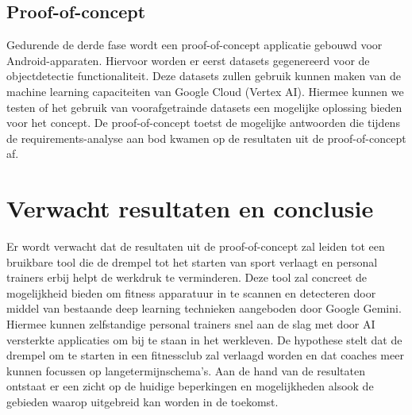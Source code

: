 \subsection{Proof-of-concept}
\label{subsec:poc}
Gedurende de derde fase wordt een proof-of-concept applicatie gebouwd voor Android-apparaten. %
Hiervoor worden er eerst datasets gegenereerd voor de objectdetectie functionaliteit.
Deze datasets zullen gebruik kunnen maken van de machine learning capaciteiten van Google Cloud (Vertex AI).
Hiermee kunnen we testen of het gebruik van voorafgetrainde datasets een mogelijke oplossing bieden voor het concept.
De proof-of-concept toetst de mogelijke antwoorden die tijdens de requirements-analyse aan bod kwamen op de resultaten uit de proof-of-concept af.

\section{Verwacht resultaten en conclusie}
\label{sec:verwacht-resultaten-en-conclusie}
Er wordt verwacht dat de resultaten uit de proof-of-concept zal leiden tot een bruikbare tool die de drempel tot het starten van sport verlaagt en personal trainers erbij helpt de werkdruk te verminderen.
Deze tool zal concreet de mogelijkheid bieden om fitness apparatuur in te scannen en detecteren door middel van bestaande deep learning technieken aangeboden door Google Gemini.
Hiermee kunnen zelfstandige personal trainers snel aan de slag met door AI versterkte applicaties om bij te staan in het werkleven.
De hypothese stelt dat de drempel om te starten in een fitnessclub zal verlaagd worden en dat coaches meer kunnen focussen op langetermijnschema's.
Aan de hand van de resultaten ontstaat er een zicht op de huidige beperkingen en mogelijkheden alsook de gebieden waarop uitgebreid kan worden in de toekomst.